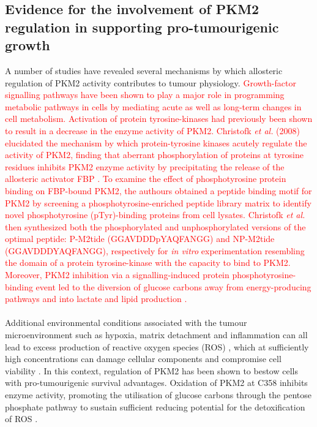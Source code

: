 \subsection{Evidence for the involvement of PKM2 regulation in supporting pro-tumourigenic growth}
A number of studies have revealed several mechanisms by which allosteric regulation of PKM2 activity contributes to tumour physiology. \textcolor{red}{Growth-factor signalling pathways have been shown to play a major role in programming metabolic pathways in cells by mediating acute as well as long-term changes in cell metabolism. Activation of protein tyrosine-kinases had previously been shown to result in a decrease in the enzyme activity of PKM2. Christofk \textit{et al.} (2008) \cite{Christofk:2008aa} elucidated the mechanism by which protein-tyrosine kinases acutely regulate the activity of PKM2, finding that aberrant phosphorylation of proteins at tyrosine residues inhibits PKM2 enzyme activity by precipitating the release of the allosteric activator FBP \cite{Christofk:2008aa}. To examine the effect of phosphotyrosine protein binding on FBP-bound PKM2, the authours obtained a peptide binding motif for PKM2 by screening a phosphotyrosine-enriched peptide library matrix to identify novel phosphotyrosine (pTyr)-binding proteins from cell lysates. Christofk \textit{et al.} then synthesized both the phosphorylated and unphosphorylated versions of the optimal peptide: P-M2tide (GGAVDDDpYAQFANGG) and NP-M2tide (GGAVDDDYAQFANGG), respectively for \textit{in vitro} experimentation resembling the domain of a protein tyrosine-kinase with the capacity to bind to PKM2. Moreover, PKM2 inhibition via a signalling-induced protein phosphotyrosine-binding event led to the diversion of glucose carbons away from energy-producing pathways and into lactate and lipid production \cite{Christofk:2008aa}. }
%
%
\\\\
%
%
Additional environmental conditions associated with the tumour microenvironment such as hypoxia, matrix detachment and inflammation can all lead to excess production of reactive oxygen species (ROS) \cite{Halliwell:2007aa,Reuter:2010aa,Schafer:2009aa}, which at sufficiently high concentrations can damage cellular components and compromise cell viability \cite{Wellen:2010aa}. In this context, regulation of PKM2 has been shown to bestow cells with pro-tumourigenic survival advantages. Oxidation of PKM2 at C358 inhibits enzyme activity, promoting the utilisation of glucose carbons through the pentose phosphate pathway to sustain sufficient reducing potential for the detoxification of ROS \cite{Anastasiou:2011aa}. 
